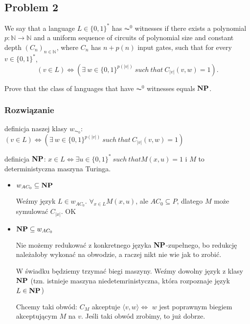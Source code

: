 \subsection{Problem 2}
We say that a language $L \in \{0, 1\}^*$ has $\AC^0$ witnesses if there exists a polynomial $p : \mathbb{N} \rightarrow \mathbb{N}$ and a uniform sequence of circuits of polynomial size and constant depth $(C_n)_{n \in \mathbb{N}}$, where $C_n$ has $n+p(n)$ input gates, such that for every $v \in \{0, 1\}^*$, 
\[
 (v \in L) \iff (\exists\ w \in \{0, 1\}^{p(|v|)}\ such\ that\ C_{|v|}(v, w) = 1).
\]

Prove that the class of languages that have $\AC^0$ witnesses equals $\textbf{NP}$.

\subsubsection*{Rozwiązanie}

definicja naszej klasy $w_{\AC_0}$: $(v \in L) \iff (\exists\ w \in \{0, 1\}^{p(|v|)}\ such\ that\ C_{|v|}(v, w) = 1)$

definicja $\textbf{NP}$: $x \in L \iff \exists u \in \{0, 1\}^*\ such\ that M(x, u) = 1$ i $M$ to deterministyczna maszyna Turinga.

\begin{itemize}
    \item $w_{AC_0} \subseteq \textbf{NP}$
    
    Weźmy język $L \in w_{AC_0}$. $\forall_{x \in L} M(x, u)$, ale $AC_0 \subseteq P$, dlatego $M$ może symulować $C_{|x|}$. OK
    
    \item $\textbf{NP} \subseteq w_{AC_0}$
    
    Nie możemy redukować z konkretnego języka $\textbf{NP}$-zupełnego, bo redukcję należałoby wykonać na obwodzie, a raczej nikt nie wie jak to zrobić.
    
    W świadku będziemy trzymać biegi maszyny. Weźmy dowolny język z klasy $\textbf{NP}$ (tzn. istnieje maszyna niedetemrinistyczna, która rozpoznaje język $L \in \textbf{NP}$)
    
    Chcemy taki obwód: $C_M$ akceptuje $\langle v, w \rangle \iff$ $w$ jest poprawnym biegiem akceptującym $M$ na $v$. Jeśli taki obwód zrobimy, to już dobrze.
    
\end{itemize}


